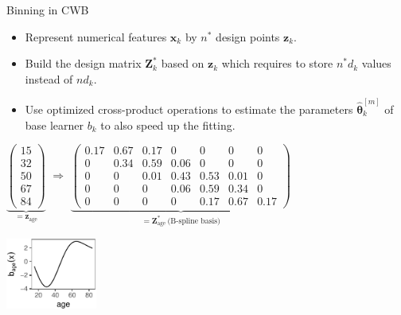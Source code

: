 \documentclass[ignorenonframetext,]{beamer}
\providecommand{\tightlist}{%
  \setlength{\itemsep}{0pt}\setlength{\parskip}{0pt}}
\newcommand{\tbh}{\hat{\bm{\theta}}}
\begin{document}
\begin{frame}{Binning in CWB}
\protect\hypertarget{binning-in-cwb}{}
\begin{itemize}
\tightlist
\item
  Represent numerical features \(\bm{x}_k\) by \(n^\ast\) design points
  \(\bm{z}_k\).
\item
  Build the design matrix \(\bm{Z}_k^\ast\) based on \(\bm{z}_k\) which
  requires to store \(n^\ast d_k\) values instead of \(nd_k\).
\item
  Use optimized cross-product operations to estimate the parameters
  \(\tbh_k^{[m]}\) of base learner \(b_k\) to also speed up the fitting.
\end{itemize}

\begin{minipage}{0.75\textwidth}
{\tiny $
\underbrace{\begin{pmatrix} 15 \\ 32 \\ 50 \\ 67 \\ 84 \end{pmatrix}}_{= \bm{z}_{\text{age}}}
$}
{\Large $\Rightarrow$}
{\tiny $
\underbrace{\begin{pmatrix}
    0.17 & 0.67 & 0.17 & 0    & 0    & 0    & 0    \\
    0    & 0.34 & 0.59 & 0.06 & 0    & 0    & 0    \\
    0    & 0    & 0.01 & 0.43 & 0.53 & 0.01 & 0    \\
    0    & 0    & 0    & 0.06 & 0.59 & 0.34 & 0    \\
    0    & 0    & 0    & 0    & 0.17 & 0.67 & 0.17
\end{pmatrix}}_{=\bm{Z}^\ast_{\text{age}}\ \text{(B-spline basis)}}
$}\hspace{0.2cm}{\Large $\Rightarrow$}
\end{minipage}
\begin{minipage}{0.2\textwidth}
\phantom{a}\vspace{-0.2cm}\hspace*{0.5cm}

\includegraphics[width=3cm]{figures/unnamed-chunk-4-1} 
\end{minipage}
\end{frame}
\end{document}
